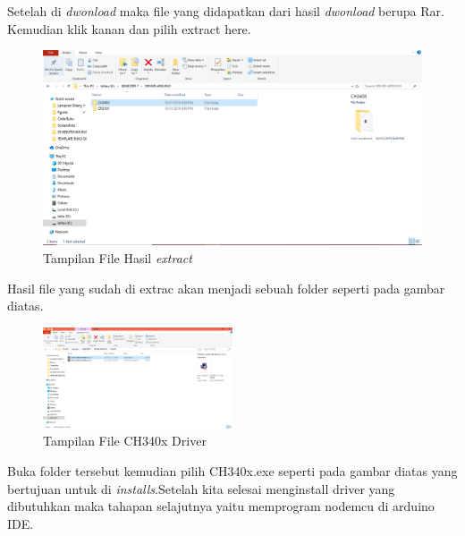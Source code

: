 \par Setelah di \textit{dwonload} maka file yang didapatkan dari hasil \textit{dwonload} berupa Rar. Kemudian klik kanan dan pilih extract here.
\begin{figure}[H]
\centering
\includegraphics[width=1\textwidth]{figures/google12.png}
\caption{Tampilan File Hasil \textit{extract} }
\label{print}
\end{figure}
\par Hasil file yang sudah di extrac akan menjadi sebuah folder seperti pada gambar diatas.
\begin{figure}[H]
\centering
\includegraphics[width=0.5\textwidth]{figures/google13.png}
\caption{Tampilan File CH340x Driver}
\label{print}
\end{figure}
\par Buka folder tersebut kemudian pilih CH340x.exe seperti pada gambar diatas yang bertujuan untuk di \textit{installs}.Setelah kita selesai menginstall driver yang dibutuhkan maka tahapan selajutnya yaitu memprogram nodemcu di arduino IDE.


